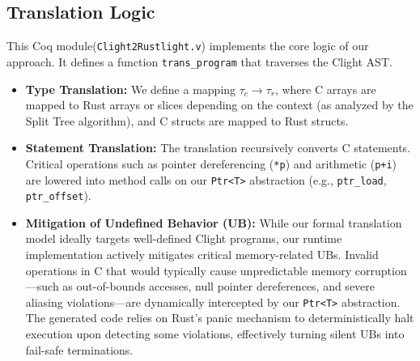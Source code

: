 \documentclass{llncs} %
\begin{document}



\subsection{Translation Logic}
This Coq module(\texttt{Clight2Rustlight.v}) implements the core logic of our approach. It defines a function \texttt{trans\_program} that traverses the Clight AST.
\begin{itemize}
    \item \textbf{Type Translation:} We define a mapping $\tau_c \to \tau_r$, where C arrays are mapped to Rust arrays or slices depending on the context (as analyzed by the Split Tree algorithm), and C structs are mapped to Rust structs.
    \item \textbf{Statement Translation:} The translation recursively converts C statements. Critical operations such as pointer dereferencing (\texttt{*p}) and arithmetic (\texttt{p+i}) are lowered into method calls on our \texttt{Ptr<T>} abstraction (e.g., \texttt{ptr\_load}, \texttt{ptr\_offset}).
    \item \textbf{Mitigation of Undefined Behavior (UB):} While our formal translation model ideally targets well-defined Clight programs, our runtime implementation actively mitigates critical memory-related UBs. Invalid operations in C that would typically cause unpredictable memory corruption---such as out-of-bounds accesses, null pointer dereferences, and severe aliasing violations---are dynamically intercepted by our \texttt{Ptr<T>} abstraction. The generated code relies on Rust's panic mechanism to deterministically halt execution upon detecting some violations, effectively turning silent UBs into fail-safe terminations.
\end{itemize}
\end{document}
